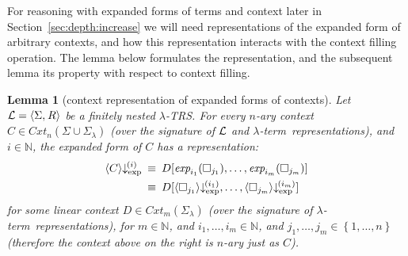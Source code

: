 \documentclass[
submission
]{dmtcs-episciences-tampered}
\newcommand{\fap}[2]{#1({#2})}
\newcommand{\iap}[2]{#1 _{#2}}
\newcommand{\indap}[2]{#1 _{#2}}
\newcommand{\subap}[2]{#1 _{#2}}
\newcommand{\bap}{\subap}
\newcommand{\bpap}[3]{#1 _{#2}^{#3}}
\newcommand{\nb}{\nobreakdash}
\newcommand{\nf}{\normalfont}
\newcommand{\tuple}[1]{\langle #1 \rangle}
\newcommand{\tuplespace}{\hspace*{0.5pt}}
\newcommand{\pair}[2]{\tuple{#1, \tuplespace #2}}
\newcommand{\setexp}[1]{\left\{{#1}\right\}}
\newcommand{\nat}{\mathbb{N}}
\newcommand{\asig}{\Sigma}
\newcommand{\asiglambda}{\indap{\asig}{\lambda}}
\newcommand{\arules}{R}
\newcommand{\alTRS}{{\cal L}}
\newcommand{\TRS}{TRS}
\newcommand{\scontextsover}{\textit{Cxt}}
\newcommand{\scontextsnover}{\bap{\scontextsover}}
\newcommand{\contextsnover}[1]{\fap{\scontextsnover{#1}}}
\newcommand{\cxtap}[2]{{#1}[#2]}
\newcommand{\acxt}{C}
\newcommand{\bcxt}{D}
\newcommand{\bcxtap}{\cxtap{\bcxt}}
\newcommand{\hole}{\Box}
\newcommand{\holei}{\iap{\hole}}
\newcommand{\nary}[1]{{$#1$}\nb-ary}
\newcommand{\ssyntequal}{{\equiv}}
\newcommand{\syntequal}{\mathrel{\ssyntequal}}
\newcommand{\scriptexp}{\text{\nf exp}}
\newcommand{\sexpand}{\textit{exp}}
\newcommand{\sexpandi}{\indap{\sexpand}}
\newcommand{\expandi}[1]{\fap{\sexpandi{#1}}}
\newcommand{\sexprednfi}[1]{{\bpap{\downarrow}{\scriptexp}{\hspace*{-1pt}(#1)}}}
\newcommand{\exprednfi}[2]{{\langle#2\rangle}\sexprednfi{#1}}
\newcommand{\lambdaterm}{$\lambda$\nb-term}
\newcommand{\lTRS}{$\lambda$\hspace*{-0.5pt}\nb-\hspace*{-0.5pt}\TRS}
\theoremstyle{plain}
\newtheorem{lemma}[theorem]{Lemma}
\theoremstyle{definition}
\begin{document}
For reasoning with expanded forms of terms and context later in Section~\ref{sec:depth:increase}
we will need representations of the expanded form of arbitrary contexts,
and how this representation interacts with the context filling operation. 
The lemma below formulates the representation, and the subsequent lemma its property with respect to context filling.


\begin{lemma}[context representation of expanded forms of contexts]\label{lem:expanded:form:cxts}
  Let $\alTRS = \pair{\asig}{\arules}$ be a finitely nested \lTRS. 
For every \nary{n} context $\acxt\in\contextsnover{n}{\asig\cup\asiglambda}$ (over the signature of $\alTRS$ and \lambdaterm\ representations), and $i\in\nat$, 
  the expanded form of $\acxt$ has a representation: 
  \begin{equation}\label{eq:lem:expanded:form:cxts}
    \begin{split}
      \exprednfi{i}{\acxt}
        \: & \syntequal\:
      \bcxtap{\expandi{i_1}{\holei{j_1}},\ldots,\expandi{i_m}{\holei{j_m}}}  
      \\
        \: & \syntequal\:
      \bcxtap{\exprednfi{i_1}{\holei{j_1}},\ldots,\exprednfi{i_m}{\holei{j_m}}}  
    \end{split}
  \end{equation}
  for some linear context $\bcxt\in\contextsnover{m}{\asiglambda}$ (over the signature of \lambdaterm\ representations), for $m\in\nat$,
  and $i_1,\ldots,i_m\in\nat$, and $j_1,\ldots,j_m\in\setexp{1,\ldots,n}$
  (therefore the context above on the right is \nary{n} just as $\acxt$).
\end{lemma}
\end{document}

